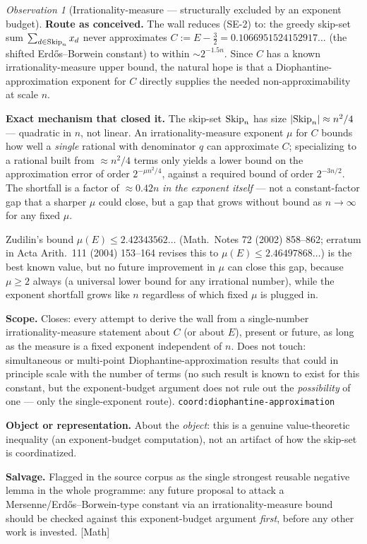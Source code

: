 \documentclass[11pt]{article}
\theoremstyle{plain}
\theoremstyle{definition}
\theoremstyle{remark}
\newtheorem{obs}[thm]{Observation}
\let\origmathrm\mathrm
\renewcommand{\mathrm}[1]{\ifmmode\origmathrm{#1}\else\textrm{#1}\fi}%
\newcommand{\ev}[1]{{\small\textsf{[#1]}}\xspace}
\newcommand{\coord}[1]{\texorpdfstring{{\small\nolinkurl{coord:#1}}}{coord:#1}\xspace}
\begin{document}
\begin{obs}[Irrationality-measure — structurally excluded by an exponent budget]
\label{obs:irrationality-measure}
\textbf{Route as conceived.} The wall reduces (SE-2) to: the greedy skip-set sum
$\sum_{d\in\mathrm{Skip}_n}x_d$ never approximates $C:=E-\tfrac32=0.1066951524152917\ldots$ (the shifted
Erdős–Borwein constant) to within $\sim 2^{-1.5n}$. Since $C$ has a known irrationality-measure
upper bound, the natural hope is that a Diophantine-approximation exponent for $C$ directly
supplies the needed non-approximability at scale $n$.

\textbf{Exact mechanism that closed it.} The skip-set $\mathrm{Skip}_n$ has size $|\mathrm{Skip}_n|\approx n^2/4$ —
quadratic in $n$, not linear. An irrationality-measure exponent $\mu$ for $C$ bounds how well a
\emph{single} rational with denominator $q$ can approximate $C$; specializing to a rational built
from $\approx n^2/4$ terms only yields a lower bound on the approximation error of order
$2^{-\mu n^2/4}$, against a required bound of order $2^{-3n/2}$. The shortfall is a factor of
$\approx 0.42n$ \emph{in the exponent itself} — not a constant-factor gap that a sharper $\mu$
could close, but a gap that grows without bound as $n\to\infty$ for any fixed $\mu$.

Zudilin's
bound $\mu(E)\le 2.42343562\ldots$ (Math.\ Notes 72 (2002) 858--862; erratum in Acta Arith.\ 111
(2004) 153--164 revises this to $\mu(E)\le 2.46497868\ldots$) is the best known value, but no future
improvement in $\mu$ can close this gap, because $\mu\ge 2$ always (a universal lower bound for any
irrational number), while the exponent shortfall grows like $n$ regardless of which fixed $\mu$ is
plugged in.

\textbf{Scope.} Closes: every attempt to derive the wall from a single-number irrationality-measure
statement about $C$ (or about $E$), present or future, as long as the measure is a fixed exponent
independent of $n$. Does not touch: simultaneous or multi-point Diophantine-approximation results
that could in principle scale with the number of terms (no such result is known to exist for this
constant, but the exponent-budget argument does not rule out the \emph{possibility} of one — only
the single-exponent route).
\coord{diophantine-approximation}

\textbf{Object or representation.} About the \emph{object}: this is a genuine value-theoretic
inequality (an exponent-budget computation), not an artifact of how the skip-set is coordinatized.

\textbf{Salvage.} Flagged in the source corpus as the single strongest reusable negative lemma in
the whole programme: any future proposal to attack a Mersenne/Erdős–Borwein-type constant via an
irrationality-measure bound should be checked against this exponent-budget argument \emph{first},
before any other work is invested.
\ev{Math}
\end{obs}
\end{document}

